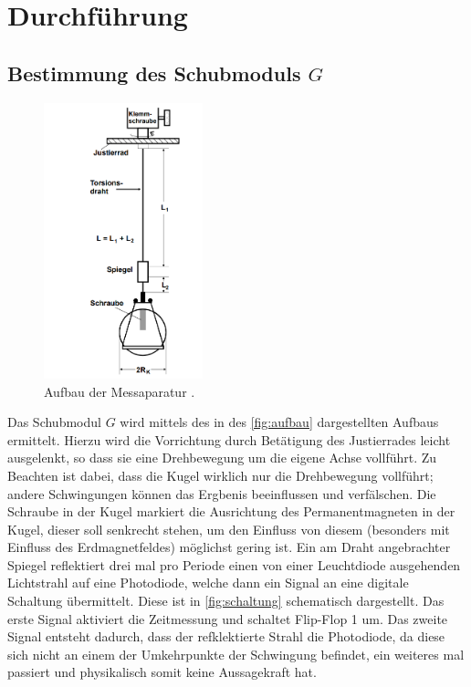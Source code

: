 \section{Durchführung}
\label{sec:Durchführung}
\subsection{Bestimmung des Schubmoduls $G$}
    \begin{figure}
        \centering
        \includegraphics[height=8cm]{content/aufbau.png}
        \caption{Aufbau der Messaparatur \cite[100]{V102}.}
        \label{fig:aufbau}
    \end{figure}
    Das Schubmodul $G$ wird mittels des in des \autoref{fig:aufbau} dargestellten Aufbaus ermittelt.
    Hierzu wird die Vorrichtung durch Betätigung des Justierrades leicht ausgelenkt, so dass sie eine Drehbewegung um die eigene
    Achse vollführt. Zu Beachten ist dabei, dass die Kugel wirklich nur die Drehbewegung vollführt; andere Schwingungen können
    das Ergbenis beeinflussen und verfälschen.
    Die Schraube in der Kugel markiert die Ausrichtung des Permanentmagneten in der Kugel, dieser soll senkrecht stehen, um den
    Einfluss von diesem (besonders mit Einfluss des Erdmagnetfeldes) möglichst gering ist.
    Ein am Draht angebrachter Spiegel reflektiert drei mal pro Periode einen von einer Leuchtdiode ausgehenden Lichtstrahl auf eine
    Photodiode, welche dann ein Signal an eine digitale Schaltung übermittelt. Diese ist in \autoref{fig:schaltung} schematisch 
    dargestellt. Das erste Signal aktiviert die Zeitmessung und schaltet Flip-Flop 1 um. Das zweite 
    Signal entsteht dadurch, dass der refklektierte Strahl die Photodiode, da diese sich nicht an einem der Umkehrpunkte der Schwingung
    befindet, ein weiteres mal passiert und physikalisch somit keine Aussagekraft hat.
